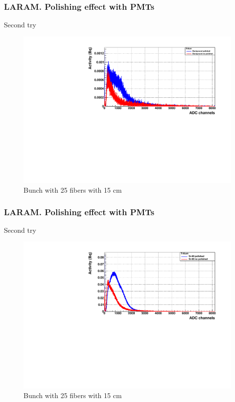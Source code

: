 \documentclass{beamer}
\begin{document}
\begin{frame}
\frametitle{LARAM. Polishing effect with PMTs}
Second try

\begin{figure}[hbtp]
\centering
\includegraphics[scale=0.5]{LARAM/Polishing_effect/Second_try/Backgrounds.pdf}
\caption{Bunch with 25 fibers with 15 cm}
\end{figure}

\end{frame}

\begin{frame}
\frametitle{LARAM. Polishing effect with PMTs}
Second try

\begin{figure}[hbtp]
\centering
\includegraphics[scale=0.5]{LARAM/Polishing_effect/Second_try/Sr_90.pdf}
\caption{Bunch with 25 fibers with 15 cm}
\end{figure}

\end{frame}
\end{document}
